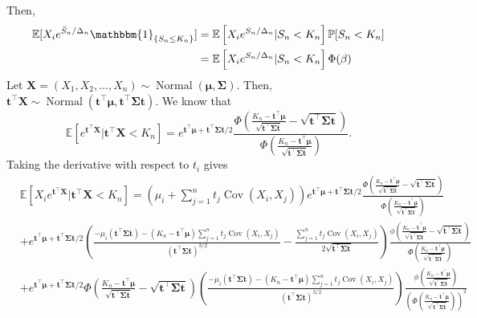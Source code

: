 \documentclass[fleqn,mnsc,nonblindrev]{informs4}
\newcommand{\Normal}{\operatorname{Normal}}
\newcommand{\EE}{\mathbb{E}}
\newcommand{\Cov}{\operatorname{Cov}}
\newcommand{\tb}[1]{\textbf{#1}}
\begin{document}
Then,
\begin{align*}
\EE[X_i e^{\bar{S}_n/\Delta_n}\mathbbm{1}_{\{S_n\leq K_n\}}]&=\mathbb{E}\left[X_ie^{S_n/\Delta_n}|S_n<K_n\right]\mathbb{P}[S_n<K_n]\\
&=\mathbb{E}\left[X_ie^{S_n/\Delta_n}|S_n<K_n\right]\Phi(\beta)
\end{align*}
Let $\tb{X}=(X_1,X_2,...,X_n)\sim\Normal(\boldsymbol{\mu},\boldsymbol{\Sigma})$. Then, $\tb{t}^\top\tb{X}\sim\Normal(\tb{t}^\top\boldsymbol{\mu},\tb{t}^\top\boldsymbol{\Sigma}\tb{t}).$ We know that
\[
\mathbb{E}\left[e^{\tb{t}^\top\tb{X}}|\tb{t}^\top\tb{X}<K_n\right]=e^{\tb{t}^\top\boldsymbol{\mu}+\tb{t}^\top\boldsymbol{\Sigma}\tb{t}/2}\frac{\Phi\left(\frac{K_n-\tb{t}^\top\boldsymbol{\mu}}{\sqrt{\tb{t}^\top\boldsymbol{\Sigma}\tb{t}}}-\sqrt{\tb{t}^\top\boldsymbol{\Sigma}\tb{t}}\right)}{\Phi\left(\frac{K_n-\tb{t}^\top\boldsymbol{\mu}}{\sqrt{\tb{t}^\top\boldsymbol{\Sigma}\tb{t}}}\right)}.
\]
Taking the derivative with respect to $t_i$ gives 
{\small \begin{align*}
&\mathbb{E}\left[X_ie^{\tb{t}^\top\tb{X}}|\tb{t}^\top\tb{X}<K_n\right]=\left(\mu_i+\sum_{j=1}^nt_j\Cov(X_i,X_j)\right)e^{\tb{t}^\top\boldsymbol{\mu}+\tb{t}^\top\boldsymbol{\Sigma}\tb{t}/2}\frac{\Phi\left(\frac{K_n-\tb{t}^\top\boldsymbol{\mu}}{\sqrt{\tb{t}^\top\boldsymbol{\Sigma}\tb{t}}}-\sqrt{\tb{t}^\top\boldsymbol{\Sigma}\tb{t}}\right)}{\Phi\left(\frac{K_n-\tb{t}^\top\boldsymbol{\mu}}{\sqrt{\tb{t}^\top\boldsymbol{\Sigma}\tb{t}}}\right)}\\
&+e^{\tb{t}^\top\boldsymbol{\mu}+\tb{t}^\top\boldsymbol{\Sigma}\tb{t}/2}\left(\frac{-\mu_i(\tb{t}^\top\boldsymbol{\Sigma}\tb{t})-(K_n-\tb{t}^\top\boldsymbol{\mu})\sum_{j= 1}^nt_j\Cov(X_i,X_j)}{\left(\tb{t}^\top\boldsymbol{\Sigma}\tb{t}\right)^{3/2}}-\frac{\sum_{j= 1}^nt_j\Cov(X_i,X_j)}{2\sqrt{\tb{t}^\top\boldsymbol{\Sigma}\tb{t}}}\right)\frac{\phi\left(\frac{K_n-\tb{t}^\top\boldsymbol{\mu}}{\sqrt{\tb{t}^\top\boldsymbol{\Sigma}\tb{t}}}-\sqrt{\tb{t}^\top\boldsymbol{\Sigma}\tb{t}}\right)}{\Phi\left(\frac{K_n-\tb{t}^\top\boldsymbol{\mu}}{\sqrt{\tb{t}^\top\boldsymbol{\Sigma}\tb{t}}}\right)}\\
&+e^{\tb{t}^\top\boldsymbol{\mu}+\tb{t}^\top\boldsymbol{\Sigma}\tb{t}/2}\Phi\left(\frac{K_n-\tb{t}^\top\boldsymbol{\mu}}{\sqrt{\tb{t}^\top\boldsymbol{\Sigma}\tb{t}}}-\sqrt{\tb{t}^\top\boldsymbol{\Sigma}\tb{t}}\right)\left(\frac{-\mu_i(\tb{t}^\top\boldsymbol{\Sigma}\tb{t})-(K_n-\tb{t}^\top\boldsymbol{\mu})\sum_{j= 1}^nt_j\Cov(X_i,X_j)}{\left(\tb{t}^\top\boldsymbol{\Sigma}\tb{t}\right)^{3/2}}\right)\frac{\phi\left(\frac{K_n-\tb{t}^\top\boldsymbol{\mu}}{\sqrt{\tb{t}^\top\boldsymbol{\Sigma}\tb{t}}}\right)}{\left(\Phi\left(\frac{K_n-\tb{t}^\top\boldsymbol{\mu}}{\sqrt{\tb{t}^\top\boldsymbol{\Sigma}\tb{t}}}\right)\right)^2}
\end{align*}
}
\end{document}

